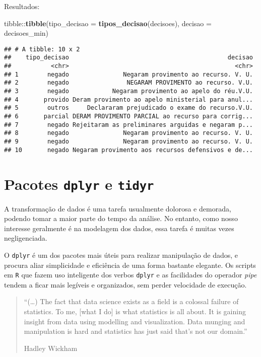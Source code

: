\documentclass[]{book}
\newenvironment{Shaded}{\begin{snugshade}}{\end{snugshade}}
\newcommand{\KeywordTok}[1]{\textcolor[rgb]{0.13,0.29,0.53}{\textbf{{#1}}}}
\newcommand{\DataTypeTok}[1]{\textcolor[rgb]{0.13,0.29,0.53}{{#1}}}
\newcommand{\NormalTok}[1]{{#1}}
\begin{document}
Resultados:

\begin{Shaded}
\begin{Highlighting}[]
\NormalTok{tibble::}\KeywordTok{tibble}\NormalTok{(}\DataTypeTok{tipo_decisao =} \KeywordTok{tipos_decisao}\NormalTok{(decisoes), }\DataTypeTok{decisao =} \NormalTok{decisoes_min)}
\end{Highlighting}
\end{Shaded}

\begin{verbatim}
## # A tibble: 10 x 2
##    tipo_decisao                                            decisao
##           <chr>                                              <chr>
## 1        negado               Negaram provimento ao recurso. V. U.
## 2        negado                NEGARAM PROVIMENTO ao recurso. V.U.
## 3        negado            Negaram provimento ao apelo do réu.V.U.
## 4       provido Deram provimento ao apelo ministerial para anul...
## 5        outros     Declararam prejudicado o exame do recurso.V.U.
## 6       parcial DERAM PROVIMENTO PARCIAL ao recurso para corrig...
## 7        negado Rejeitaram as preliminares arguidas e negaram p...
## 8        negado               Negaram provimento ao recurso. V. U.
## 9        negado               Negaram provimento ao recurso. V. U.
## 10       negado Negaram provimento aos recursos defensivos e de...
\end{verbatim}

\section{\texorpdfstring{Pacotes \texttt{dplyr} e
\texttt{tidyr}}{Pacotes dplyr e tidyr}}\label{pacotes-dplyr-e-tidyr}

A transformação de dados é uma tarefa usualmente dolorosa e demorada,
podendo tomar a maior parte do tempo da análise. No entanto, como nosso
interesse geralmente é na modelagem dos dados, essa tarefa é muitas
vezes negligenciada.

O \texttt{dplyr} é um dos pacotes mais úteis para realizar manipulação
de dados, e procura aliar simplicidade e eficiência de uma forma
bastante elegante. Os scripts em \texttt{R} que fazem uso inteligente
dos verbos \texttt{dplyr} e as facilidades do operador \emph{pipe}
tendem a ficar mais legíveis e organizados, sem perder velocidade de
execução.

\begin{quote}
``(\ldots{}) The fact that data science exists as a field is a colossal
failure of statistics. To me, {[}what I do{]} is what statistics is all
about. It is gaining insight from data using modelling and
visualization. Data munging and manipulation is hard and statistics has
just said that's not our domain.''

Hadley Wickham
\end{quote}
\end{document}
